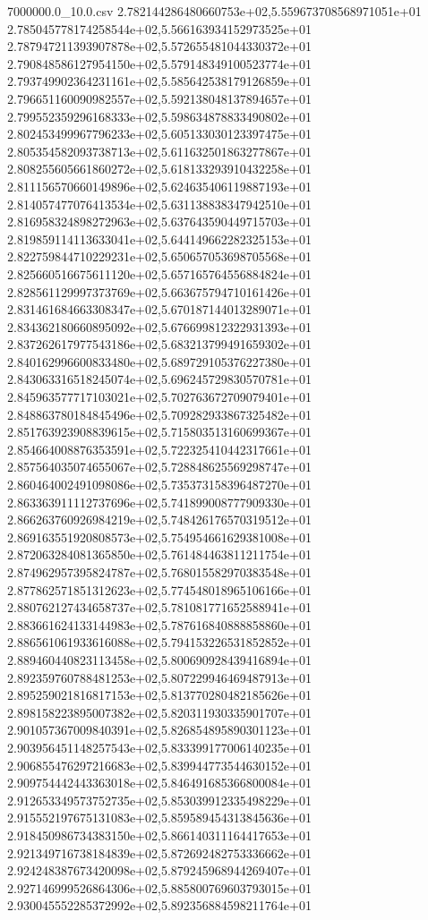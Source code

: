 \begin{filecontents*}{7000000.0_10.0.csv}
2.782144286480660753e+02,5.559673708568971051e+01
2.785045778174258544e+02,5.566163934152973525e+01
2.787947211393907878e+02,5.572655481044330372e+01
2.790848586127954150e+02,5.579148349100523774e+01
2.793749902364231161e+02,5.585642538179126859e+01
2.796651160090982557e+02,5.592138048137894657e+01
2.799552359296168333e+02,5.598634878833490802e+01
2.802453499967796233e+02,5.605133030123397475e+01
2.805354582093738713e+02,5.611632501863277867e+01
2.808255605661860272e+02,5.618133293910432258e+01
2.811156570660149896e+02,5.624635406119887193e+01
2.814057477076413534e+02,5.631138838347942510e+01
2.816958324898272963e+02,5.637643590449715703e+01
2.819859114113633041e+02,5.644149662282325153e+01
2.822759844710229231e+02,5.650657053698705568e+01
2.825660516675611120e+02,5.657165764556884824e+01
2.828561129997373769e+02,5.663675794710161426e+01
2.831461684663308347e+02,5.670187144013289071e+01
2.834362180660895092e+02,5.676699812322931393e+01
2.837262617977543186e+02,5.683213799491659302e+01
2.840162996600833480e+02,5.689729105376227380e+01
2.843063316518245074e+02,5.696245729830570781e+01
2.845963577717103021e+02,5.702763672709079401e+01
2.848863780184845496e+02,5.709282933867325482e+01
2.851763923908839615e+02,5.715803513160699367e+01
2.854664008876353591e+02,5.722325410442317661e+01
2.857564035074655067e+02,5.728848625569298747e+01
2.860464002491098086e+02,5.735373158396487270e+01
2.863363911112737696e+02,5.741899008777909330e+01
2.866263760926984219e+02,5.748426176570319512e+01
2.869163551920808573e+02,5.754954661629381008e+01
2.872063284081365850e+02,5.761484463811211754e+01
2.874962957395824787e+02,5.768015582970383548e+01
2.877862571851312623e+02,5.774548018965106166e+01
2.880762127434658737e+02,5.781081771652588941e+01
2.883661624133144983e+02,5.787616840888858860e+01
2.886561061933616088e+02,5.794153226531852852e+01
2.889460440823113458e+02,5.800690928439416894e+01
2.892359760788481253e+02,5.807229946469487913e+01
2.895259021816817153e+02,5.813770280482185626e+01
2.898158223895007382e+02,5.820311930335901707e+01
2.901057367009840391e+02,5.826854895890301123e+01
2.903956451148257543e+02,5.833399177006140235e+01
2.906855476297216683e+02,5.839944773544630152e+01
2.909754442443363018e+02,5.846491685366800084e+01
2.912653349573752735e+02,5.853039912335498229e+01
2.915552197675131083e+02,5.859589454313845636e+01
2.918450986734383150e+02,5.866140311164417653e+01
2.921349716738184839e+02,5.872692482753336662e+01
2.924248387673420098e+02,5.879245968944269407e+01
2.927146999526864306e+02,5.885800769603793015e+01
2.930045552285372992e+02,5.892356884598211764e+01

\end{filecontents*}
